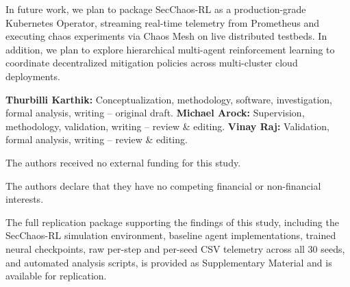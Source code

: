 \documentclass[ASNA,twocolumn]{USG}
\begin{document}
In future work, we plan to package SecChaos-RL as a production-grade Kubernetes Operator, streaming real-time telemetry from Prometheus and executing chaos experiments via Chaos Mesh on live distributed testbeds. In addition, we plan to explore hierarchical multi-agent reinforcement learning to coordinate decentralized mitigation policies across multi-cluster cloud deployments.


\textbf{Thurbilli Karthik:} Conceptualization, methodology, software, investigation, formal analysis, writing -- original draft. \textbf{Michael Arock:} Supervision, methodology, validation, writing -- review \& editing. \textbf{Vinay Raj:} Validation, formal analysis, writing -- review \& editing.

The authors received no external funding for this study.

The authors declare that they have no competing financial or non-financial interests.

The full replication package supporting the findings of this study, including the SecChaos-RL simulation environment, baseline agent implementations, trained neural checkpoints, raw per-step and per-seed CSV telemetry across all 30 seeds, and automated analysis scripts, is provided as Supplementary Material and is available for replication.


\end{document}

